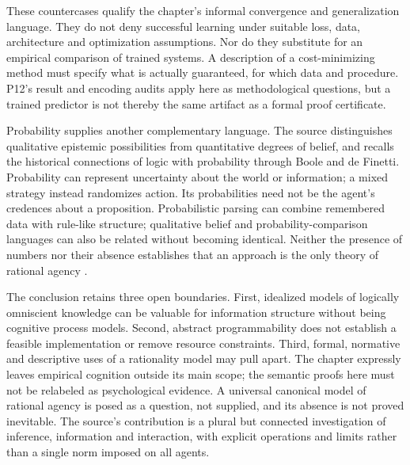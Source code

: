 These countercases qualify the chapter's informal convergence and
generalization language. They do not deny successful learning under
suitable loss, data, architecture and optimization assumptions. Nor do
they substitute for an empirical comparison of trained systems. A
description of a cost-minimizing method must specify what is actually
guaranteed, for which data and procedure. P12's result and encoding audits
apply here as methodological questions, but a trained predictor is not
thereby the same artifact as a formal proof certificate.

Probability supplies another complementary language. The source
distinguishes qualitative epistemic possibilities from quantitative
degrees of belief, and recalls the historical connections of logic with
probability through Boole and de Finetti. Probability can represent
uncertainty about the world or information; a mixed strategy instead
randomizes action. Its probabilities need not be the agent's credences
about a proposition. Probabilistic parsing can combine remembered data
with rule-like structure; qualitative belief and probability-comparison
languages can also be related without becoming identical. Neither the
presence of numbers nor their absence establishes that an approach is
the only theory of rational agency
\cite[pp.~193--194]{VanBenthemLiuSmets2021Logico}.

The conclusion retains three open boundaries. First, idealized models
of logically omniscient knowledge can be valuable for information
structure without being cognitive process models. Second, abstract
programmability does not establish a feasible implementation or remove
resource constraints. Third, formal, normative and descriptive uses
of a rationality model may pull apart. The chapter expressly leaves
empirical cognition outside its main scope; the semantic proofs here
must not be relabeled as psychological evidence. A universal canonical
model of rational agency is posed as a question, not supplied, and its
absence is not proved inevitable. The source's contribution is a
plural but connected investigation of inference, information and
interaction, with explicit operations and limits rather than a single
norm imposed on all agents.
